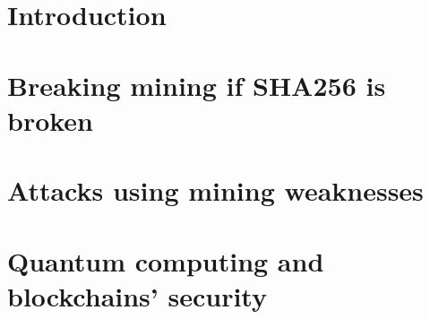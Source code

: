 \documentclass[a4paper,twoside,10pt]{report}
\begin{document}

\thispagestyle{empty}

\tableofcontents %
\thispagestyle{empty}
\clearpage



\chapter{Introduction}
\setcounter{page}{1}

  

  

  

  


%  

%  

\chapter{Breaking mining if SHA256 is broken}

	

  

  

  

  

\chapter{Attacks using mining weaknesses}

  

  

\chapter{Quantum computing and blockchains' security}

  

  

  

\appendix



\nocite{*}


\end{document}

